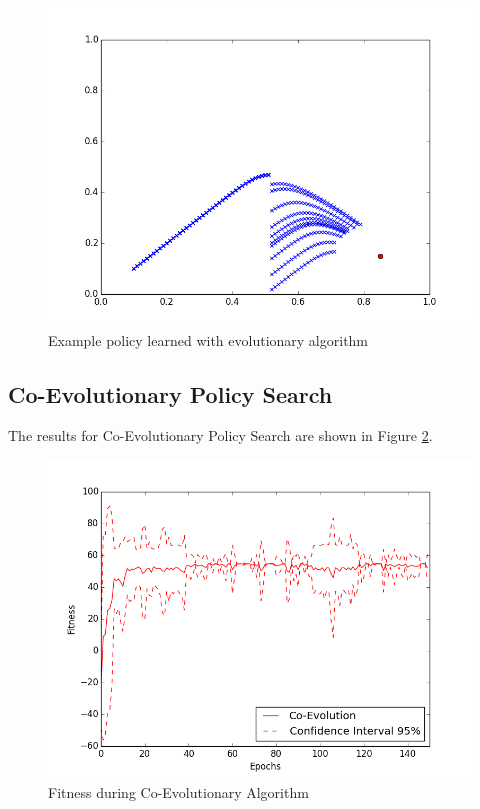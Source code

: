 \begin{figure}[ht]
  \centering
  \includegraphics[scale=0.5]{images/evo_result.png}
  \caption{Example policy learned with evolutionary algorithm}\label{Example policy learned with evolutionary algorithm}
\end{figure}

\subsection{Co-Evolutionary Policy Search}

The results for Co-Evolutionary Policy Search are shown in Figure \ref{Fitness during Co-Evolutionary Algorithm}.  

\begin{figure}[ht]
  \centering
  \includegraphics[scale=0.5]{images/co_evo.png}
  \caption{Fitness during Co-Evolutionary Algorithm}\label{Fitness during Co-Evolutionary Algorithm}
\end{figure}

